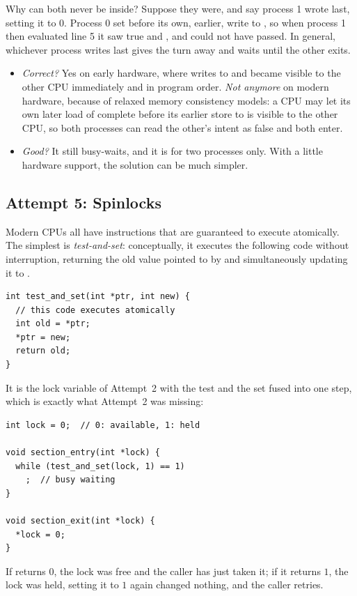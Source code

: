 Why can both never be inside? Suppose they were, and say process 1 wrote  last, setting it to $0$. Process 0 set  before its own, earlier, write to , so when process 1 then evaluated line 5 it saw  true and , and could not have passed. In general, whichever process writes  last gives the turn away and waits until the other exits.
\begin{itemize}
  \item \emph{Correct?} Yes on early hardware, where writes to  and  became visible to the other CPU immediately and in program order. \emph{Not anymore} on modern hardware, because of relaxed memory consistency models: a CPU may let its own later load of  complete before its earlier store to  is visible to the other CPU, so both processes can read the other's intent as false and both enter.
  \item \emph{Good?} It still busy-waits, and it is for two processes only. With a little hardware support, the solution can be much simpler.
\end{itemize}

\subsection{Attempt 5: Spinlocks}

Modern CPUs all have instructions that are guaranteed to execute atomically. The simplest is \emph{test-and-set}: conceptually, it executes the following code without interruption, returning the old value pointed to by  and simultaneously updating it to .
\begin{lstlisting}
int test_and_set(int *ptr, int new) {
  // this code executes atomically
  int old = *ptr;
  *ptr = new;
  return old;
}
\end{lstlisting}
It is the lock variable of Attempt~2 with the test and the set fused into one step, which is exactly what Attempt~2 was missing:
\begin{lstlisting}
int lock = 0;  // 0: available, 1: held

void section_entry(int *lock) {
  while (test_and_set(lock, 1) == 1)
    ;  // busy waiting
}

void section_exit(int *lock) {
  *lock = 0;
}
\end{lstlisting}
If  returns $0$, the lock was free and the caller has just taken it; if it returns $1$, the lock was held, setting it to $1$ again changed nothing, and the caller retries.

